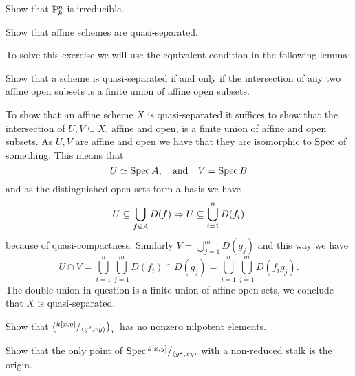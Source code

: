 \documentclass[12pt]{memoir}
\begin{document}
\begin{Ej}[5.1.A Vakil]
    Show that $\mathbb{P}^n_k$ is irreducible.
\end{Ej}

\begin{ptcbr}

\end{ptcbr}

\begin{Ej}[5.1.G Vakil]
    Show that affine schemes are quasi-separated. 
\end{Ej}

To solve this exercise we will use the equivalent condition in the following lemma:

\begin{Lem}[5.1.F Vakil]
    Show that a scheme is quasi-separated if and only if the intersection of any two affine open subsets is a finite union of affine open subsets.
\end{Lem}

\begin{ptcbr}
To show that an affine scheme $X$ is quasi-separated it suffices to show that the intersection of $U,V\subseteq X$, affine and open, is a finite union of affine and open subsets. As $U,V$ are affine and open we have that they are isomorphic to $\operatorname{Spec}$ of something. This means that 
$$U\simeq\operatorname{Spec} A,\quad\text{and}\quad V=\operatorname{Spec} B$$
and as the distinguished open sets form a basis we have 
$$U\subseteq \bigcup_{f\in A}D(f)\Rightarrow U\subseteq \bigcup_{i=1}^n D(f_i)$$
because of quasi-compactness. Similarly $V=\bigcup_{j=1}^m D(g_j)$ and this way we have 
$$U\cap V=\bigcup_{i=1}^n\bigcup_{j=1}^m D(f_i)\cap D(g_j)=\bigcup_{i=1}^n\bigcup_{j=1}^m D(f_ig_j).$$
The double union in question is a finite union of affine open sets, we conclude that $X$ is quasi-separated.
\end{ptcbr}

\begin{Ej}[5.2.D Vakil]
    Show that $\left(\quot{k[x,y]}{\genr{y^2,xy}}\right)_x$ has no nonzero nilpotent elements.
\par 
Show that the only point of
$\Spec\quot{k[x,y]}{\genr{y^2,xy}}$ with a non-reduced stalk is the origin.
\end{Ej}

\begin{ptcbr}

\end{ptcbr}
\end{document}
